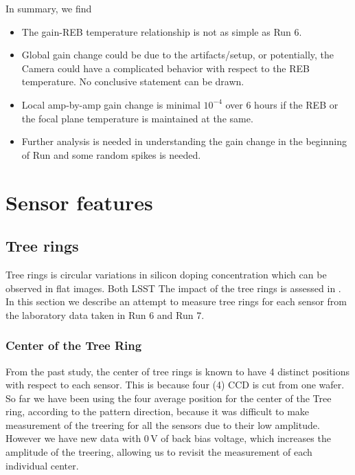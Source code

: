 In summary, we find
\begin{itemize}
    \item The gain-REB temperature relationship is not as simple as Run 6.
    \item Global gain change could be due to the artifacts/setup, or potentially, the Camera could have a complicated behavior with respect to the REB temperature. No conclusive statement can be drawn.
    \item Local amp-by-amp gain change is minimal $10^{-4}$ over 6 hours if the REB or the focal plane temperature is maintained at the same.
    \item Further analysis is needed in understanding the gain change in the beginning of Run and some random spikes is needed.
\end{itemize}

\section{Sensor features}\label{sensor-features}

\subsection{Tree rings}\label{tree-rings}
Tree rings is circular variations in silicon doping concentration which can be observed in flat images. Both LSST The impact of the tree rings is assessed in \citep{2017Jinst..12C05015,2020JATIS...6a1005P, 2023PASP..135k5003E}. In this section we describe an attempt to measure tree rings for each sensor from the laboratory data taken in Run 6 and Run 7.
\subsubsection{Center of the Tree Ring}
From the past study, the center of tree rings is known to have 4 distinct positions with respect to each sensor. This is because four (4) CCD is cut from one wafer. 
So far we have been using the four average position for the center of the Tree ring, according to the pattern direction, because it was difficult to make measurement of the treering for all the sensors due to their low amplitude. However we have new data with 0\,V of back bias voltage, which increases the amplitude of the treering, allowing us to revisit the measurement of each individual center.

